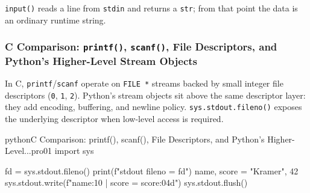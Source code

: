 \texttt{input()} reads a line from \texttt{stdin} and returns a \texttt{str}; from that point the data is an ordinary runtime string.

\subsubsection{C Comparison: \texttt{printf()}, \texttt{scanf()}, File Descriptors, and Python's Higher-Level Stream Objects}

In C, \texttt{printf}/\texttt{scanf} operate on \texttt{FILE *} streams backed by small integer file descriptors (\texttt{0}, \texttt{1}, \texttt{2}). Python's stream objects sit above the same descriptor layer: they add encoding, buffering, and newline policy. \texttt{sys.stdout.fileno()} exposes the underlying descriptor when low-level access is required.

\begin{codebox}[]{python}{C Comparison: printf(), scanf(), File Descriptors, and Python's Higher-Level...}{pro01}
import sys

fd = sys.stdout.fileno()
print(f"stdout fileno = {fd}")
name, score = "Kramer", 42
sys.stdout.write(f"{name:10} | score = {score:04d}\n")
sys.stdout.flush()
\end{codebox}


